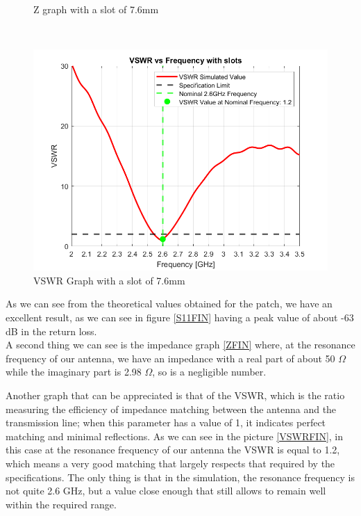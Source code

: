 \documentclass[]{article}
\begin{document}
\begin{figure}[h]
\begin{minipage}{0.48\linewidth}
		\caption{Z graph with a slot of 7.6mm}
		\label{ZFIN}
	\end{minipage}
	\\[1em] %
	\begin{minipage}{0.48\linewidth}
		\centering
		\includegraphics[width=\linewidth]{img/VSWR_with_slot_small}
		\caption{VSWR Graph with a slot of 7.6mm}
		\label{VSWRFIN}
	\end{minipage}
\end{figure}

As we can see from the theoretical values obtained for the patch, we have an excellent result, as we can see in figure \eqref{S11FIN} having a peak value of about -63 dB in the return loss.\\
A second thing we can see is the impedance graph \eqref{ZFIN} where, at the resonance frequency of our antenna, we have an impedance with a real part of about 50 $\Omega$ while the imaginary part is 2.98 $\Omega$, so is a negligible number.

Another graph that can be appreciated is that of the VSWR, which is the ratio measuring the efficiency of impedance matching between the antenna and the transmission line; when this parameter has a value of 1, it indicates perfect matching and minimal reflections. As we can see in the picture \eqref{VSWRFIN}, in this case at the resonance frequency of our antenna the VSWR is equal to 1.2, which means a very good matching that largely respects that required by the specifications. 
The only thing is that in the simulation, the resonance frequency is not quite 2.6 GHz, but a value close enough that still allows to remain well within the required range.
\end{document}

